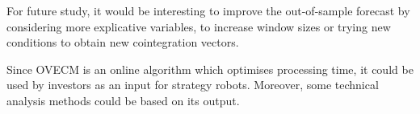 For future study, it would be interesting to improve the out-of-sample forecast
by considering more explicative variables, to increase window sizes or trying new
conditions to obtain new cointegration vectors. 

Since OVECM is an online algorithm which optimises processing time, it could be
used by investors as an input for strategy robots. Moreover, some technical
analysis methods could be based on its output. 


